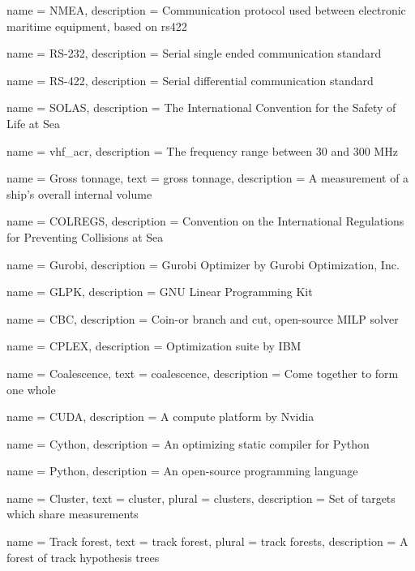 {
	name 		= NMEA,
	description = {Communication protocol used between electronic maritime equipment, based on \gls{rs422}}
}

{
	name 		= RS-232,
	description = {Serial single ended communication standard}
}

{
	name 		= RS-422,
	description = {Serial differential communication standard}
}


{
	name 		= SOLAS,
	description = {The International Convention for the Safety of Life at Sea}
}

{
	name 		= \gls{vhf_acr},
	description = {The frequency range between 30 and 300 MHz}
}

{
	name 		= Gross tonnage,
	text 		= gross tonnage,
	description = {A measurement of a ship's overall internal volume}
}

{
	name 		= COLREGS,
	description = {Convention on the International Regulations for Preventing Collisions at Sea}
}

{
	name 		= Gurobi,
	description = {Gurobi Optimizer by Gurobi Optimization, Inc.}
}

{
	name 		= GLPK,
	description = {GNU Linear Programming Kit}
}

{
	name 		= CBC,
	description = {Coin-or branch and cut, open-source MILP solver}
}

{
	name 		= CPLEX,
	description = {Optimization suite by IBM}
}

{
	name 		= Coalescence,
	text 		= coalescence,
	description = {Come together to form one whole}
}

{
	name 		= CUDA,
	description = {A compute platform by Nvidia}
}

{
	name 		= Cython,
	description = {An optimizing static compiler for Python}
}

{
	name 		= Python,
	description = {An open-source programming language}
}

{
	name 		= Cluster,
	text 		= cluster,
	plural 		= clusters,
	description = {Set of \glspl{target} which share \glspl{measurement}}
}

{
	name 		= {Track forest},
	text 		= {track forest},
	plural 		= {track forests},
	description = {A forest of track hypothesis trees}
}

